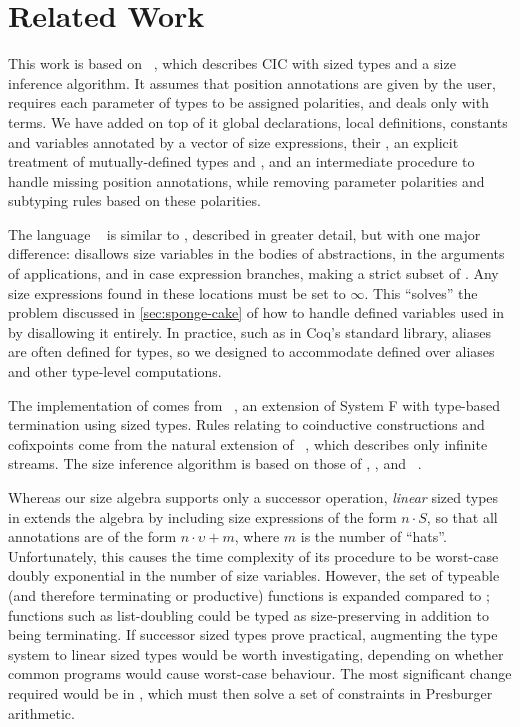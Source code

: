 \section{Related Work}\label{sec:related}

This work is based on \CIChat~\citep{cic-hat}, which describes CIC with sized types and a size inference algorithm.
It assumes that position annotations are given by the user, requires each parameter of \coinductive types to be assigned polarities, and deals only with terms.
We have added on top of it global declarations, local definitions, constants and variables annotated by a vector of size expressions, their \deltaDeltareductions, an explicit treatment of mutually-defined \coinductive types and \cofixpoints, and an intermediate procedure \RecCheckLoop to handle missing position annotations, while removing parameter polarities and subtyping rules based on these polarities.

The language \CIChatminus~\citep{cic-hat-minus} is similar to \CIChat, described in greater detail, but with one major difference: \CIChatminus disallows size variables in the bodies of abstractions, in the arguments of applications, and in case expression branches, making \CIChatminus a strict subset of \CIChat.
Any size expressions found in these locations must be set to $\infty$.
This ``solves'' the problem discussed in \autoref{sec:sponge-cake} of how to handle defined variables used in \cofixpoints by disallowing it entirely.
In practice, such as in Coq's standard library, aliases are often defined for \coinductive types, so we designed \lang to accommodate \cofixpoints defined over aliases and other type-level computations.

The implementation of \RecCheck comes from \Fhat~\citep{f-hat}, an extension of System F with type-based termination using sized types.
Rules relating to coinductive constructions and cofixpoints come from the natural extension of \CChatomega~\citep{cc-hat-omega}, which describes only infinite streams.
The size inference algorithm is based on those of \CIChat, \CChatomega, and \CIChatl~\citep{cic-hat-l}.

Whereas our size algebra supports only a successor operation, \emph{linear} sized types in \CIChatl extends the algebra by including size expressions of the form $n \cdot S$, so that all annotations are of the form $n \cdot \upsilon + m$, where $m$ is the number of ``hats''.
Unfortunately, this causes the time complexity of its \RecCheck procedure to be worst-case doubly exponential in the number of size variables.
However, the set of typeable (and therefore terminating or productive) functions is expanded compared to \lang; functions such as list-doubling could be typed as size-preserving in addition to being terminating.
If successor sized types prove practical, augmenting the type system to linear sized types would be worth investigating, depending on whether common programs would cause worst-case behaviour.
The most significant change required would be in \RecCheck, which must then solve a set of constraints in Presburger arithmetic.

